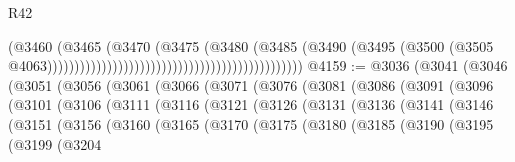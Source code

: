 \begin{lexlean}{R42}
\begin{coremodule}
{                                                                              (@3460
                                                                                (@3465
                                                                                  (@3470
                                                                                    (@3475
                                                                                      (@3480
                                                                                        (@3485
                                                                                          (@3490
                                                                                            (@3495
                                                                                              (@3500
                                                                                                (@3505
                                                                                                  @4063)))))))))))))))))))))))))))))))))))))))))))))))
@4159 := @3036
    (@3041
      (@3046
        (@3051
          (@3056
            (@3061
              (@3066
                (@3071
                  (@3076
                    (@3081
                      (@3086
                        (@3091
                          (@3096
                            (@3101
                              (@3106
                                (@3111
                                  (@3116
                                    (@3121
                                      (@3126
                                        (@3131
                                          (@3136
                                            (@3141
                                              (@3146
                                                (@3151
                                                  (@3156
                                                    (@3160
                                                      (@3165
                                                        (@3170
                                                          (@3175
                                                            (@3180
                                                              (@3185
                                                                (@3190
                                                                  (@3195
                                                                    (@3199
                                                                      (@3204
}
\end{coremodule}
\end{lexlean}
